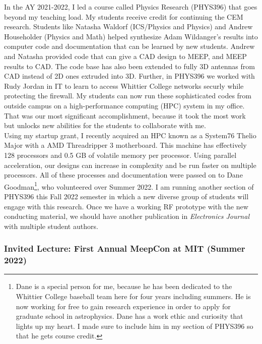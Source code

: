 \documentclass[../../../main.tex]{subfiles}
\begin{document}
In the AY 2021-2022, I led a course called Physics Research (PHYS396) that goes beyond my teaching load.  My students receive credit for continuing the CEM research.  Students like Natasha Waldorf (ICS/Physics and Physics) and Andrew Householder (Physics and Math) helped synthesize Adam Wildanger's results into computer code and documentation that can be learned by new students.  Andrew and Natasha provided code that can give a CAD design to MEEP, and MEEP results to CAD.  The code base has also been extended to fully 3D antennas from CAD instead of 2D ones extruded into 3D.  Further, in PHYS396 we worked with Rudy Jordan in IT to learn to access Whittier College networks securly while protecting the firewall.  My students can now run these sophisticated codes from outside campus on a high-performance computing (HPC) system in my office.  That was our most significant accomplishment, because it took the most work but unlocks new abilities for the students to collaborate with me.
\\
\vspace{0.15cm}
Using my startup grant, I recently acquired an HPC known as a System76 Thelio Major with a AMD Threadripper 3 motherboard.  This machine has effectively 128 processors and 0.5 GB of volatile memory per processor.  Using parallel acceleration, our designs can increase in complexity and be run faster on multiple processors.  All of these processes and documentation were passed on to Dane Goodman\footnote{Dane is a special person for me, because he has been dedicated to the Whittier College baseball team here for four years including summers. He is now working for free to gain research experience in order to apply for graduate school in astrophysics.  Dane has a work ethic and curiosity that lights up my heart.  I made sure to include him in my section of PHYS396 so that he gets course credit.}, who volunteered over Summer 2022.  I am running another section of PHYS396 this Fall 2022 semester in which a new diverse group of students will engage with this research.  Once we have a working RF prototype with the new conducting material, we should have another publication in \textit{Electronics Journal} with multiple student authors.

\subsubsection{Invited Lecture: First Annual MeepCon at MIT (Summer 2022)}
\end{document}
